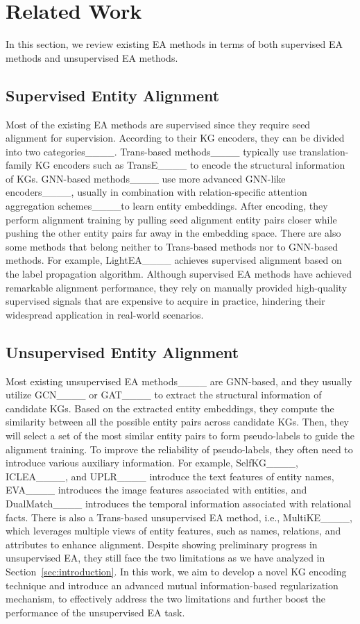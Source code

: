 \section{Related Work}
\label{sec:relate}
In this section, we review existing EA methods in terms of both supervised EA methods and unsupervised EA methods.

\subsection{Supervised Entity Alignment}
Most of the existing EA methods are supervised since they require seed alignment for supervision. According to their KG encoders, they can be divided into two categories____. Trans-based methods____ typically use translation-family KG encoders such as TransE____ to encode the structural information of KGs. GNN-based methods____ use more advanced GNN-like encoders____, usually in combination with relation-specific attention aggregation schemes____to learn entity embeddings. After encoding, they perform alignment training by pulling seed alignment entity pairs closer while pushing the other entity pairs far away in the embedding space. There are also some methods that belong neither to Trans-based methods nor to GNN-based methods. For example, LightEA____ achieves supervised alignment based on the label propagation algorithm. Although supervised EA methods have achieved remarkable alignment performance, they rely on manually provided high-quality supervised signals that are expensive to acquire in practice, hindering their widespread application in real-world scenarios.


\subsection{Unsupervised Entity Alignment}
Most existing unsupervised EA methods____ are GNN-based, and they usually utilize GCN____ or GAT____ to extract the structural information of candidate KGs. Based on the extracted entity embeddings, they compute the similarity between all the possible entity pairs across candidate KGs. Then, they will select a set of the most similar entity pairs to form pseudo-labels to guide the alignment training. To improve the reliability of pseudo-labels, they often need to introduce various auxiliary information. For example, SelfKG____, ICLEA____, and UPLR____ introduce the text features of entity names, EVA____ introduces the image features associated with entities, and DualMatch____ introduces the temporal information associated with relational facts. There is also a Trans-based unsupervised EA method, i.e., MultiKE____, which leverages multiple views of entity features, such as names, relations, and attributes to enhance alignment. Despite showing preliminary progress in unsupervised EA, they still face the two limitations as we have analyzed in Section~\ref{sec:introduction}. In this work, we aim to develop a novel KG encoding technique and introduce an advanced mutual information-based regularization mechanism, to effectively address the two limitations and further boost the performance of the unsupervised EA task. 

